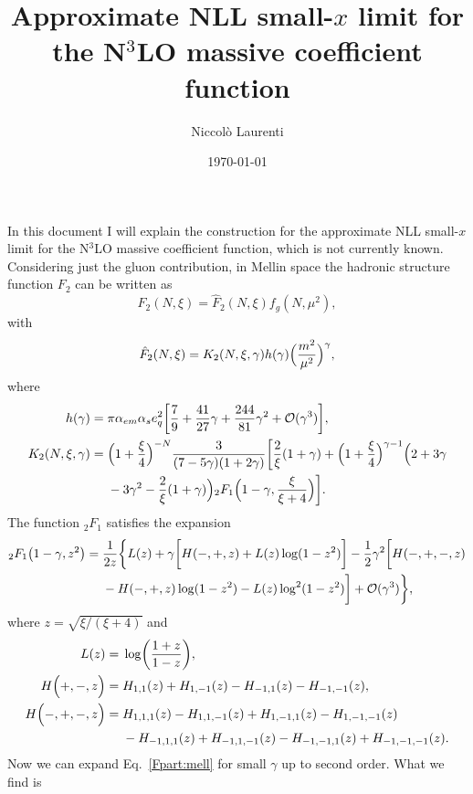 \documentclass[a4paper]{article}
\title{Approximate NLL small-$x$ limit for the N$^3$LO massive coefficient function}
\author{Niccolò Laurenti}
\date{\today}
\begin{document}
	\maketitle
	In this document I will explain the construction for the approximate NLL small-$x$ limit for the N$^3$LO massive coefficient function, which is not currently known.
	Considering just the gluon contribution, in Mellin space the hadronic structure function $F_2$ can be written as
	\begin{equation}
		F_{2}(N,\xi)=\hat{F}_{2}(N,\xi) f_{g}(N,\mu^2),\label{impact}
	\end{equation}
	with
	\begin{equation}\label{Fpart:mell}
		\hat{F}_{2}(N,\xi)= K_{2}(N,\xi,\gamma)h(\gamma)\Bigl(\frac{m^2}{\mu^2}\Bigr)^\gamma,
	\end{equation}
where
\begin{align}
	h(\gamma)={}&\pi \alpha_{em} \alpha_s e_q^2 \biggl[\frac{7}{9} + \frac{41}{27}\gamma +\frac{244}{81}\gamma^2 +\mathcal{O}(\gamma^3)\biggr], \\
	K_{2}(N,\xi,\gamma)={}&\Bigl(1+\frac{\xi}{4}\Bigr)^{-N}\frac{3}{(7-5\gamma)(1+2\gamma)}\biggl[\frac{2}{\xi}(1+\gamma) + \Bigl(1+\frac{\xi}{4}\Bigr)^{\gamma-1}\Bigl(2+3\gamma \notag \\
	&- 3\gamma^2 -\frac{2}{\xi}(1+\gamma)\Bigr) {}_2F_1\Bigl(1-\gamma,\frac{\xi}{\xi +4}\Bigr)\biggr]. \label{K}
\end{align}
The function ${}_2F_1$ satisfies the expansion
\begin{align}
	{}_2F_1\bigl(1-\gamma,z^2\bigr)={}&\frac{1}{2z}\biggl\{L(z) + \gamma \biggl[H(-,+,z)+L(z)\log(1-z^2)\biggr] - \frac{1}{2}\gamma^2\biggl[H(-,+,-,z) \notag \\
	&-H(-,+,z)\log(1-z^2)-L(z)\log^2(1-z^2)\biggr]+\mathcal{O}(\gamma^3)\biggr\},
\end{align}
where $z=\sqrt{\xi/(\xi+4)}$ and
\begin{align}
	L(z)={}&\log\biggl(\frac{1+z}{1-z}\biggr), \\
	H\Bigl(+,-,z\Bigr)={}&H_{1,1}(z)+H_{1,-1}(z)-H_{-1,1}(z)-H_{-1,-1}(z) ,\\
	H\Bigl(-,+,-,z\Bigr)={}&H_{1,1,1}(z)-H_{1,1,-1}(z)+H_{1,-1,1}(z) - H_{1,-1,-1}(z) \notag \\
	&- H_{-1,1,1}(z) + H_{-1,1,-1}(z) - H_{-1,-1,1}(z) + H_{-1,-1,-1}(z).
\end{align}
Now we can expand Eq.~\eqref{Fpart:mell} for small $\gamma$ up to second order. What we find is
\end{document}
